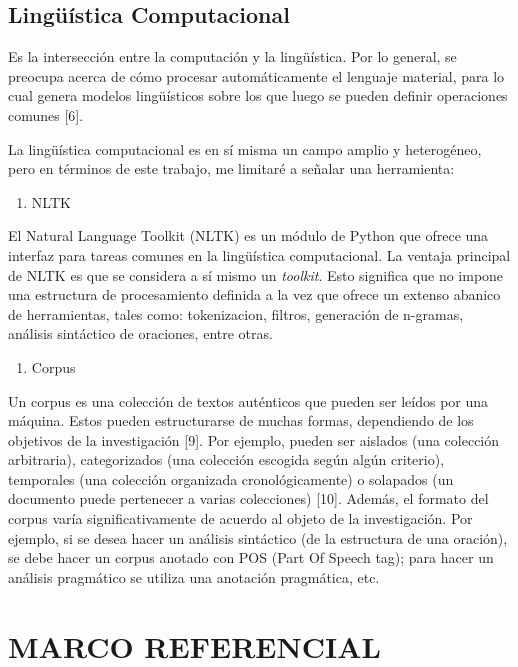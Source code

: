 \documentclass[twoside]{article}
\begin{document}
\subsection{Lingüística Computacional}
\label{sec:org15d7310}


Es la intersección entre la computación y la lingüística. Por lo
general, se preocupa acerca de cómo procesar automáticamente el
lenguaje material, para lo cual genera modelos lingüísticos sobre los
que luego se pueden definir operaciones comunes [6].


La lingüística computacional es en sí misma un campo amplio y
heterogéneo, pero en términos de este trabajo, me limitaré a señalar
una herramienta:

\begin{enumerate}
\item NLTK
\end{enumerate}

El Natural Language Toolkit (NLTK) es un módulo de Python que ofrece
una interfaz para tareas comunes en la lingüística computacional. La
ventaja principal de NLTK es que se considera a sí mismo un
\emph{toolkit}. Esto significa que no impone una estructura de
procesamiento definida a la vez que ofrece un extenso abanico de
herramientas, tales como: tokenizacion, filtros, generación de
n-gramas, análisis sintáctico de oraciones, entre otras.

\begin{enumerate}
\item Corpus
\end{enumerate}


Un corpus es una colección de textos auténticos que pueden ser leídos
por una máquina. Estos pueden estructurarse de muchas formas,
dependiendo de los objetivos de la investigación [9]. Por ejemplo,
pueden ser aislados (una colección arbitraria), categorizados (una
colección escogida según algún criterio), temporales (una colección
organizada cronológicamente) o solapados (un documento puede
pertenecer a varias colecciones) [10]. Además, el formato del corpus
varía significativamente de acuerdo al objeto de la investigación. Por
ejemplo, si se desea hacer un análisis sintáctico (de la estructura de
una oración), se debe hacer un corpus anotado con POS (Part Of Speech
tag); para hacer un análisis pragmático se utiliza una anotación
pragmática, etc.

\section{MARCO REFERENCIAL}
\label{sec:org9869c3c}
\end{document}
